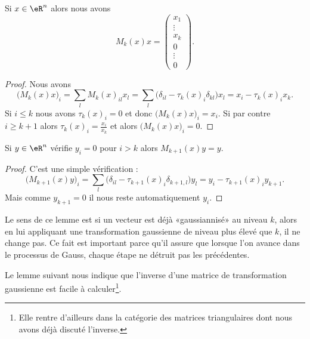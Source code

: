 \begin{lemma}
    Si \( x\in \eR^n\) alors nous avons
    \begin{equation}
        M_k(x)x=\begin{pmatrix}
            x_1    \\
            \vdots    \\
            x_k    \\
            0    \\
            \vdots    \\
            0
        \end{pmatrix}.
    \end{equation}
\end{lemma}

\begin{proof}
    Nous avons
    \begin{equation}
        \big( M_k(x)x \big)_i=\sum_lM_k(x)_{il}x_l=\sum_l\big( \delta_{il}-\tau_k(x)_i\delta_{kl} \big)x_l=x_i-\tau_k(x)_ix_k.
    \end{equation}
    Si \( i\leq k\) nous avons \( \tau_k(x)_i=0\) et donc \(  \big( M_k(x)x \big)_i=x_i   \). Si par contre \( i\geq k+1\) alors \( \tau_k(x)_i=\frac{ x_i }{ x_k }\) et alors \( \big( M_k(x)x \big)_i=0\).
\end{proof}

\begin{lemma}       \label{LEMooPFWWooUmMsVH}
    Si \( y\in \eR^n\) vérifie \( y_i=0\) pour \( i>k\) alors \( M_{k+1}(x)y=y\).
\end{lemma}

\begin{proof}
    C'est une simple vérification :
    \begin{equation}
        \big( M_{k+1}(x)y \big)_i=\sum_l\big( \delta_{il}-\tau_{k+1}(x)_i\delta_{k+1,l} \big)y_l=y_i-\tau_{k+1}(x)_iy_{k+1}.
    \end{equation}
    Mais comme \( y_{k+1}=0\) il nous reste automatiquement \( y_i\).
\end{proof}
Le sens de ce lemme est si un vecteur est déjà «gaussiannisé» au niveau \( k\), alors en lui appliquant une transformation gaussienne de niveau plus élevé que \( k\), il ne change pas. Ce fait est important parce qu'il assure que lorsque l'on avance dans le processus de Gauss, chaque étape ne détruit pas les précédentes.

Le lemme suivant nous indique que l'inverse d'une matrice de transformation gaussienne est facile à calculer\footnote{Elle rentre d'ailleurs dans la catégorie des matrices triangulaires dont nous avons déjà discuté l'inverse.}.

